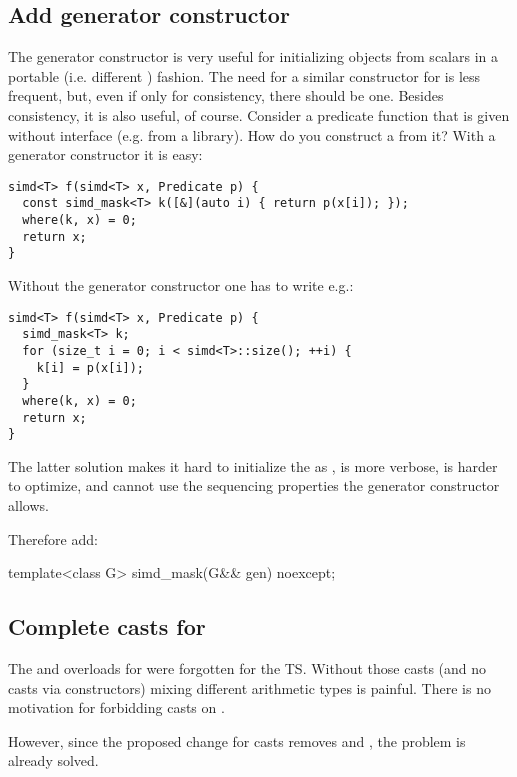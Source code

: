 \subsection{Add  generator constructor}
The  generator constructor is very useful for initializing objects
from scalars in a portable (i.e. different ) fashion.
The need for a similar constructor for  is less frequent, but,
even if only for consistency, there should be one.
Besides consistency, it is also useful, of course.
Consider a predicate function that is given without  interface (e.g. from a library).
How do you construct a  from it?
With a generator constructor it is easy:
\medskip\begin{lstlisting}[style=Vc]
simd<T> f(simd<T> x, Predicate p) {
  const simd_mask<T> k([&](auto i) { return p(x[i]); });
  where(k, x) = 0;
  return x;
}
\end{lstlisting}
Without the generator constructor one has to write e.g.:
\medskip\begin{lstlisting}[style=Vc]
simd<T> f(simd<T> x, Predicate p) {
  simd_mask<T> k;
  for (size_t i = 0; i < simd<T>::size(); ++i) {
    k[i] = p(x[i]);
  }
  where(k, x) = 0;
  return x;
}
\end{lstlisting}
The latter solution makes it hard to initialize the  as , is more verbose, is harder to optimize, and cannot use the sequencing properties the generator constructor allows.

Therefore add:
\begin{wgText}
\begin{itemdecl}
template<class G> simd_mask(G&& gen) noexcept;
\end{itemdecl}
\end{wgText}

\subsection{Complete casts for }
The  and  overloads for  were forgotten for the TS.
Without those casts (and no casts via constructors) mixing different arithmetic types is painful.
There is no motivation for forbidding casts on .

However, since the proposed change for casts removes  and
, the problem is already solved.

